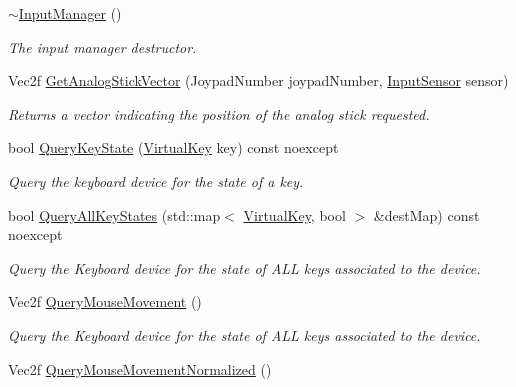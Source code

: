 \begin{DoxyCompactItemize}
\item 
\mbox{\label{class_blade_1_1_input_manager_afdd309a456f24335b01544db7d55f400}} 
\hyperlink{class_blade_1_1_input_manager_afdd309a456f24335b01544db7d55f400}{$\sim$\+Input\+Manager} ()
\begin{DoxyCompactList}\small\item\em The input manager destructor. \end{DoxyCompactList}\item 
Vec2f \hyperlink{class_blade_1_1_input_manager_ab41a4d4a8352903e18ba578316c36dc7}{Get\+Analog\+Stick\+Vector} (Joypad\+Number joypad\+Number, \hyperlink{namespace_blade_a1ecca198b7e0afbe43139ec2b0db937c}{Input\+Sensor} sensor)
\begin{DoxyCompactList}\small\item\em Returns a vector indicating the position of the analog stick requested. \end{DoxyCompactList}\item 
bool \hyperlink{class_blade_1_1_input_manager_a8d8e424cb1de012c830296a0812ceebc}{Query\+Key\+State} (\hyperlink{namespace_blade_a15d9bde4921fb2a9a953f8d97ea49d1c}{Virtual\+Key} key) const noexcept
\begin{DoxyCompactList}\small\item\em Query the keyboard device for the state of a key. \end{DoxyCompactList}\item 
bool \hyperlink{class_blade_1_1_input_manager_a6223ce5641fedc88d8e8591deb73ac90}{Query\+All\+Key\+States} (std\+::map$<$ \hyperlink{namespace_blade_a15d9bde4921fb2a9a953f8d97ea49d1c}{Virtual\+Key}, bool $>$ \&dest\+Map) const noexcept
\begin{DoxyCompactList}\small\item\em Query the Keyboard device for the state of A\+LL keys associated to the device. \end{DoxyCompactList}\item 
Vec2f \hyperlink{class_blade_1_1_input_manager_ab1fe795118afeb4642342567d3e27b3f}{Query\+Mouse\+Movement} ()
\begin{DoxyCompactList}\small\item\em Query the Keyboard device for the state of A\+LL keys associated to the device. \end{DoxyCompactList}\item 
Vec2f \hyperlink{class_blade_1_1_input_manager_aa96a587de7ed5234b2b7883df48c0a09}{Query\+Mouse\+Movement\+Normalized} ()

\end{DoxyCompactItemize}
